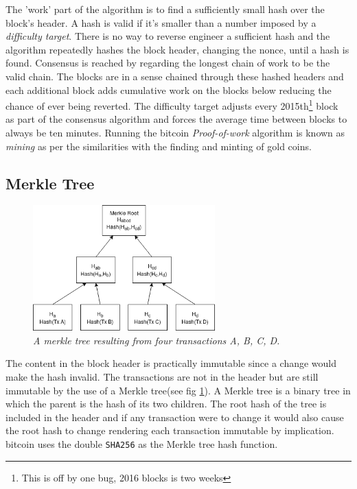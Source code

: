 The 'work' part of the algorithm is to find a sufficiently small hash over the block's header. A hash is valid if it's smaller than a number imposed by a \textit{difficulty target}. There is no way to reverse engineer a sufficient hash and the algorithm repeatedly hashes the block header, changing the nonce, until a hash is found. Consensus is reached by regarding the longest chain of work to be the valid chain. The blocks are in a sense chained through these hashed headers and each additional block adds cumulative work on the blocks below reducing the chance of ever being reverted. The difficulty target adjusts every 2015th\footnote{This is off by one bug, 2016 blocks is two weeks} block~\cite{repository:bitcoin} as part of the consensus algorithm and forces the average time between blocks to always be ten minutes. Running the bitcoin \textit{Proof-of-work} algorithm is known as \textit{mining} as per the similarities with the finding and minting of gold coins.

\subsection{Merkle Tree}

\begin{figure}[!htb]
	
	\centering
	\includegraphics[width=7cm]{images/merkle.png}
	\caption{\textit{A merkle tree resulting from four transactions A, B, C, D.
	}}
	\label{fig:merkle:tree}
	
\end{figure}

The content in the block header is practically immutable since a change would make the hash invalid. The transactions are not in the header but are still immutable by the use of a Merkle tree(see fig \ref{fig:merkle:tree}). A Merkle tree is a binary tree in which the parent is the hash of its two children. The root hash of the tree is included in the header and if any transaction were to change it would also cause the root hash to change rendering each transaction immutable by implication. \gls{bitcoin} uses the double \texttt{SHA256} as the Merkle tree hash function.

